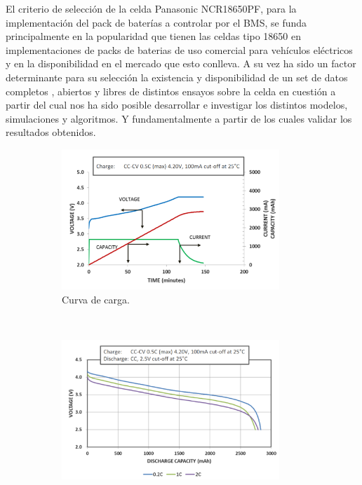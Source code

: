 \documentclass[10pt, a4paper]{report}
\begin{document}
El criterio de selección de la celda Panasonic NCR18650PF, para la
implementación del pack de baterías a controlar por el \acrshort{BMS}, se funda
principalmente en la popularidad que tienen las celdas tipo 18650 en
implementaciones de packs de baterias de uso comercial para vehículos eléctricos
y en la disponibilidad en el mercado que esto conlleva. A su vez ha
sido un factor determinante para su selección la existencia y disponibilidad de
un set de datos completos \cite{Kollmeyer2018}, abiertos y libres de distintos
ensayos sobre la celda en cuestión a partir del cual nos ha sido posible
desarrollar e investigar los distintos modelos, simulaciones y algoritmos. Y
fundamentalmente a partir de los cuales validar los resultados obtenidos.  

\begin{figure}[h!]
    \begin{subfigure}[t]{.5\textwidth}
	\includegraphics[width=0.9\textwidth]{cc_cv_18650.png}
	\caption{Curva de carga.}
	\label{cc_cv_18650}
    \end{subfigure}%
    ~ 
    \begin{subfigure}[t]{.5\textwidth}
	\includegraphics[width=0.9\textwidth]{discharge_18650.png}

\end{subfigure}
\end{figure}
\end{document}
